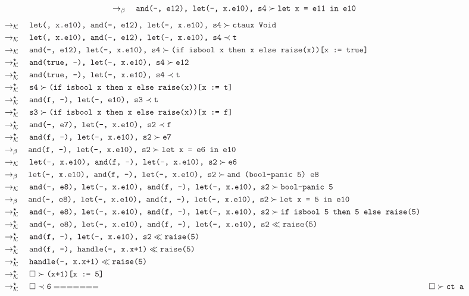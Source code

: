 \documentclass{article}
\newcommand{\tx}[1]{\textcolor{Black} {\texttt{#1}}}
\newcommand{\es}{$\square$}
\newcommand{\pop}[2]{ \tx{#1} \succ \tx{#2}}
\newcommand{\push}[2]{ \tx{#1} \prec \tx{#2}}
\newcommand{\prop}[2]{\tx{#1} \ll \tx{#2}}
\newcommand{\kr}{\rightarrow_{\mathcal{K}} \quad}
\newcommand{\br}{\rightarrow_{\beta} \quad}
\newcommand{\krs}{\rightarrow_{\mathcal{K}}^{\star} \quad}
\begin{document}
\begin{enumerate}
\begin{align*}
        &\br \pop{and(-, e12), let(-, x.e10), s4}{let x = e11 in e10}\\
    \end{align*}
    \begin{align*}
        &\kr \pop{let(, x.e10), and(-, e12), let(-, x.e10), s4}{ctaux Void}\\
        &\kr \push{let(, x.e10), and(-, e12), let(-, x.e10), s4}{t}\\
        &\kr \pop{and(-, e12), let(-, x.e10), s4}{(if isbool x then x else raise(x))[x := true]}\\
        &\krs \pop{and(true, -), let(-, x.e10), s4}{e12}\\
        &\krs \push{and(true, -), let(-, x.e10), s4}{t}\\
        &\krs \pop{s4}{(if isbool x then x else raise(x))[x := t]}\\
        &\krs \push{and(f, -), let(-, e10), s3}{t}\\
        &\krs \pop{s3}{(if isbool x then x else raise(x))[x := f]}\\
        &\krs \push{and(-, e7), let(-, x.e10), s2}{f}\\
        &\krs \pop{and(f, -), let(-, x.e10), s2}{e7}\\
        &\br \pop{and(f, -), let(-, x.e10), s2}{let x = e6 in e10}\\
        &\kr \pop{let(-, x.e10), and(f, -), let(-, x.e10), s2}{e6}\\
        &\br \pop{let(-, x.e10), and(f, -), let(-, x.e10), s2}{and (bool-panic 5) e8}\\
        &\kr \pop{and(-, e8), let(-, x.e10), and(f, -), let(-, x.e10), s2}{bool-panic 5}\\
        &\br \pop{and(-, e8), let(-, x.e10), and(f, -), let(-, x.e10), s2}{let x = 5 in e10}\\
        &\krs \pop{and(-, e8), let(-, x.e10), and(f, -), let(-, x.e10), s2}{if isbool 5 then 5 else raise(5)}\\
        &\krs \prop{and(-, e8), let(-, x.e10), and(f, -), let(-, x.e10), s2}{raise(5)}\\
        &\krs \prop{and(f, -), let(-, x.e10), s2}{raise(5)}\\
        &\krs \prop{and(f, -), handle(-, x.x+1)}{raise(5)}\\
        &\krs \prop{handle(-, x.x+1)}{raise(5)}\\
        &\krs \pop{\es}{(x+1)[x := 5]}\\
        &\krs \push{\es}{6}
=======
        &\pop{\es}{ct a} \\

\end{align*}
\end{enumerate}
\end{document}

